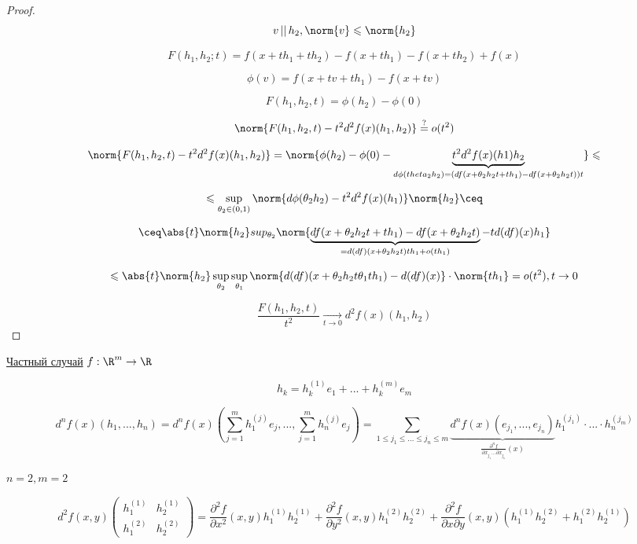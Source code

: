 \begin{enumerate}
\begin{proof}
\quad


\[
    v \,||\, h_2, \norm{v} \leqslant \norm{h_2}     
\]

\[
    F(h_1, h_2; t) = f(x + t h_1 + t h_2) - f(x + th_1) - f(x + th_2) + f(x) 
\]

\[
    \phi(v) = f(x + tv + th_1) - f(x + tv)
\]

\[
    F(h_1, h_2, t) = \phi(h_2) - \phi(0)
\]

\[
    \norm{F(h_1, h_2, t) - t ^ 2 d ^ 2 f(x) (h_1, h_2)} \overset{?}{=} o(t^2) 
\]

\[
    \norm{F(h_1, h_2, t) - t ^ 2 d ^ 2 f(x) (h_1, h_2)} = \norm{\phi(h_2) - \phi(0) - \underbrace{t^2 d^2 f(x) (h1) h_2}_{d \phi(theta_2 h_2) = (df(x + \theta_2 h_2 t + t h_1) - df(x + \theta_2 h_2 t)) t}} \leqslant
\]

\[ \leqslant \sup_{\theta_2 \in (0, 1) } \norm{d\phi(\theta_2  h_2) - t^2 d^2 f(x) (h_1)} \norm{h_2} \ceq
\]


\[
    \ceq \abs{t} \norm{h_2} sup_{\theta_2} \norm{\underbrace{df(x + \theta_2 h_2 t + t h_1) - df(x + \theta_2 h_2 t)}_{=d (df) (x + \theta_2 h_2 t) t h_1 + o(t h_1)} - t d(df)(x)h_1}
\]

\[
    \leqslant \abs{t} \norm{h_2} \sup_{\theta_2}  \sup_{\theta_1} \norm{
        d(df)(x + \theta_2 h_2 t \theta_1 t h_1) - d(df)(x)
    } \cdot \norm{t h_1} = o(t^2), t \to 0
\]


\[
    \frac{F(h_1, h_2, t)}{t ^ 2} \underset{t \to 0} {\to} d^2 f(x) (h_1, h_2)
\]
    \end{proof}
\end{enumerate}

\underline{Частный случай} $f : \R^m \to \R$

\[
    h_k = h^{(1)}_k e_1 + ... + h^{(m)}_k e_m
\]

\[
    d^n f(x) (h_1, ..., h_n) = 
    d ^ n f(x) \left(\sum_{j = 1}^m h_1^{(j)}e_j, ..., \sum_{j = 1}^m h_n^{(j)} e_j \right) = 
    \sum_{1 \leqslant j_1 \leqslant ... \leqslant j_n \leqslant m} \underbrace{d^n f(x) (e_{j_1}, ... ,e_{j_n})}_{\frac{\partial ^ n f}{\partial x_{j_1} ... \partial x_{j_n}}(x) } h_1^{(j_1)} \cdot ... \cdot h_n ^ {(j_m)}
\]

$
    n = 2, m = 2
$

\[
    d ^ 2 f(x, y) \begin{pmatrix}
        h_1^{(1)}&h_2^{(1)}\\
        h_1^{(2)}&h_2^{(2)}
    \end{pmatrix} = 
    \frac{\partial ^ 2 f}{\partial x ^ 2}(x, y) h_1^{(1)} h_2^{(1)} +
    \frac{\partial ^ 2 f}{\partial y ^ 2}(x, y)
    h_1^{(2)} h_2^{(2)} +
    \frac{\partial ^ 2 f}{\partial x \partial y} (x, y) (h_1 ^ {(1)} h_2 ^ {(2)} + h_1 ^ {(2)} h_2 ^ {(1)})
\]

